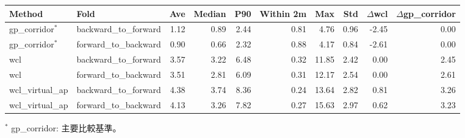 \begin{tabular}{llrrrrrrrr}
\toprule
Method & Fold & Ave & Median & P90 & Within 2m & Max & Std & $\Delta$wcl & $\Delta$gp\_corridor \\
\midrule
gp\_corridor$^{\ast}$ & backward\_to\_forward & 1.12 & 0.89 & 2.44 & 0.81 & 4.76 & 0.96 & -2.45 & 0.00 \\
gp\_corridor$^{\ast}$ & forward\_to\_backward & 0.90 & 0.66 & 2.32 & 0.88 & 4.17 & 0.84 & -2.61 & 0.00 \\
wcl & backward\_to\_forward & 3.57 & 3.22 & 6.48 & 0.32 & 11.85 & 2.42 & 0.00 & 2.45 \\
wcl & forward\_to\_backward & 3.51 & 2.81 & 6.09 & 0.31 & 12.17 & 2.54 & 0.00 & 2.61 \\
wcl\_virtual\_ap & backward\_to\_forward & 4.38 & 3.74 & 8.36 & 0.24 & 13.64 & 2.82 & 0.81 & 3.26 \\
wcl\_virtual\_ap & forward\_to\_backward & 4.13 & 3.26 & 7.82 & 0.27 & 15.63 & 2.97 & 0.62 & 3.23 \\
\bottomrule
\end{tabular}
\par\footnotesize $^{\ast}$ gp\_corridor: 主要比較基準。
